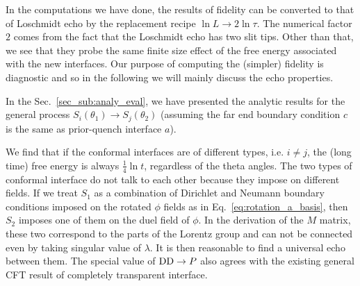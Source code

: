 

In the computations we have done, the results of fidelity can be converted to that of Loschmidt echo by the replacement recipe $ \ln L \rightarrow 2 \ln \tau$. The numerical factor $2$ comes from the fact that the Loschmidt echo has two slit tips. Other than that, we see that they probe the same finite size effect of the free energy associated with the new interfaces. Our purpose of computing the (simpler) fidelity is diagnostic and so in the following we will mainly discuss the echo properties. 

In the Sec.~\ref{sec_sub:analy_eval}, we have presented the analytic results for the general process $S_i( \theta_1 ) \rightarrow S_j( \theta_2 )$ {\iffalse {\color{red}described in Eq.~\eqref{eq:S_i_S_j}}\fi} (assuming the far end boundary condition $c$ is the same as prior-quench interface $a$). 

We find that if the conformal interfaces are of different types, i.e. $i \ne j$, the (long time) free energy is always $\frac{1}{4} \ln t$, regardless of the theta angles. The two types of conformal interface do not talk to each other because they impose on different fields. If we treat $S_1$ as a combination of Dirichlet and Neumann boundary conditions imposed on the rotated $\phi$ fields as in Eq.~\eqref{eq:rotation_a_basis}, then $S_2$ imposes one of them on the duel field of $\phi$. In the derivation of the $M$ matrix, these two correspond to the parts of the Lorentz group and can not be connected even by taking singular value of $\lambda$. It is then reasonable to find a universal echo between them. The special value of ${\rm DD} \rightarrow P$ also agrees with the existing general CFT result of completely transparent interface\cite{stephan_logarithmic_2013,stephan_local_2011,vasseur_universal_2014,vasseur_crossover_2013,kennes_universal_2014}. 


